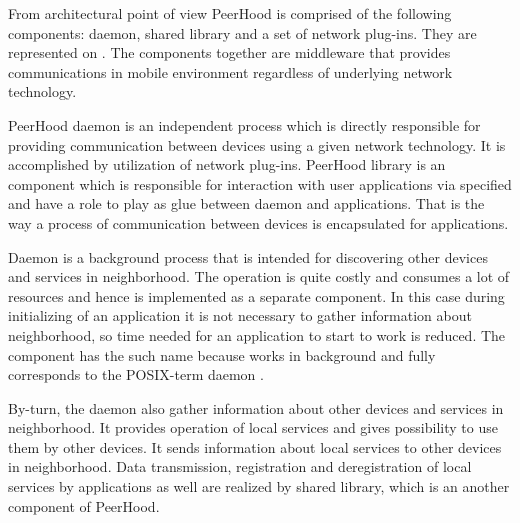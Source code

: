 %
From architectural point of view PeerHood is comprised of the following components: daemon, shared library and a set of network plug-ins. 
%
They are represented on . 
%
The components together are  middleware that provides communications in mobile  environment regardless of underlying network technology. 


%
PeerHood daemon is an independent process which is directly responsible for providing communication between devices using a given network technology. 
%
It is accomplished by utilization of network plug-ins. 
%
PeerHood library is an component which is responsible for interaction with user applications via specified  and have a role to play as glue between daemon and applications. 
%
That is the way a process of communication between devices is encapsulated for applications. 



%
Daemon is a background process that is intended for discovering other devices and services in neighborhood. 
%
The operation is quite costly and consumes a lot of resources and hence is implemented as a separate component. 
%
In this case during initializing of an application it is not necessary to gather information about neighborhood, so time needed for an application to start to work is reduced. 
%
The component has the such name because works in background and fully corresponds to the POSIX-term daemon . 

%
By-turn, the daemon also gather information about other devices and services in neighborhood. 
%
It provides operation of local services and gives possibility to use them by other devices. 
%
It sends information about local services to other devices in neighborhood. 
%
Data transmission, registration and deregistration of local services by applications as well are realized by shared library, which is an another component of PeerHood. 


